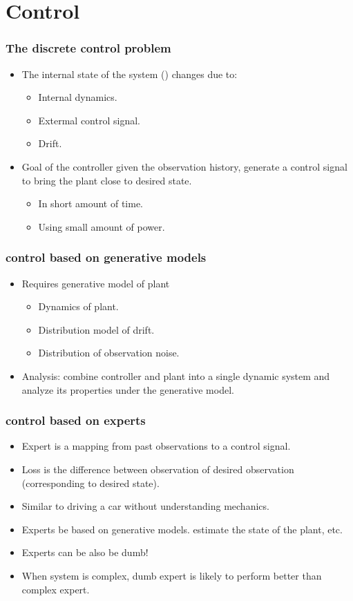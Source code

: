 \documentclass{beamer}
\begin{document}
\section{Control}

\begin{frame}
\frametitle{The discrete {\bf control} problem}
\begin{itemize}
\item The internal state of the system () changes due to:
\begin{itemize}
\item Internal dynamics.
\item Extermal control signal.
\item Drift.
\end{itemize}
\item Goal of the controller given the observation history, generate a
  control signal to bring the plant close to desired state.
\begin{itemize}
\item In short amount of time.
\item Using small amount of power.
\end{itemize}
\end{itemize}
\end{frame}

\begin{frame}
\frametitle{control based on generative models}
\begin{itemize}
\item Requires generative model of plant
\begin{itemize}
\item Dynamics of plant.
\item Distribution model of drift.
\item Distribution of observation noise.
\end{itemize}
\item Analysis: combine controller and plant into a single dynamic
  system and analyze its properties under the generative model.
\end{itemize}
\end{frame}

\begin{frame}
\frametitle{control based on experts}
\begin{itemize}
\item Expert is a mapping from past observations to a control signal.
\item Loss is the difference between observation of desired
  observation (corresponding to desired state).
\item Similar to driving a car without understanding mechanics.
\item Experts  be based on generative models.  estimate
  the state of the plant, etc.
\item Experts can be also be dumb! 
\item When system is complex, dumb expert is likely to perform better
  than complex expert.
\end{itemize}
\end{frame}
\end{document}
